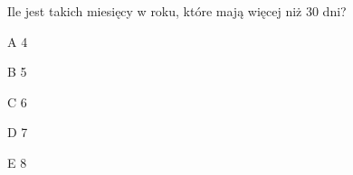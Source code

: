 \begin{tresc}
Ile jest takich miesięcy w roku, które mają więcej niż 30 dni?
\end{tresc}
\begin{wariant}{A} 4 \end{wariant}
\begin{wariant}{B} 5 \end{wariant}
\begin{wariant}{C} 6 \end{wariant}
\begin{wariant}{D} 7 \end{wariant}
\begin{wariant}{E} 8 \end{wariant}
